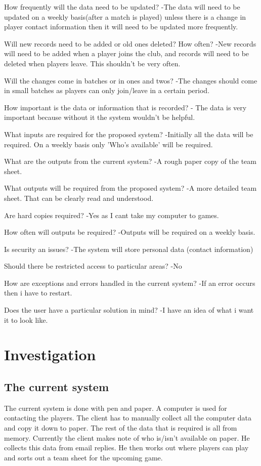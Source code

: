 How frequently will the data need to be updated?
-The data will need to be updated on a weekly basis(after a match is played) unless there is a change in player contact information then it will need to be updated more frequently. 

Will new records need to be added or old ones deleted? How often?
-New records will need to be added when a player joins the club, and records will need to be deleted when players leave. This shouldn't be very often.

Will the changes come in batches or in ones and twos?
-The changes should come in small batches as players can only join/leave in a certain period.

How important is the data or information that is recorded?
- The data is very important because without it the system wouldn't be helpful. 

What inputs are required for the proposed system?
-Initially all the data will be required. On a weekly basis only 'Who's available' will be required.

What are the outputs from the current system?
-A rough paper copy of the team sheet. 

What outputs will be required from the proposed system?
-A more detailed team sheet. That can be clearly read and understood.

Are hard copies required?
-Yes as I cant take my computer to games. 

How often will outputs be required?
-Outputs will be required on a weekly basis.

Is security an issues?
-The system will store personal data (contact information)

Should there be restricted access to particular areas?
-No

How are exceptions and errors handled in the current system?
-If an error occurs then i have to restart. 

Does the user have a particular solution in mind?
-I have an idea of what i want it to look like. 
\section{Investigation}

\subsection{The current system}
The current system is done with pen and paper. A computer is used for contacting the players. The client has to manually collect all the computer data and copy it down to paper. The rest of the data that is required is all from memory. Currently the client makes note of who is/isn't available on paper. He collects this data from email replies.  He then works out where players can play and sorts out a team sheet for the upcoming game.



